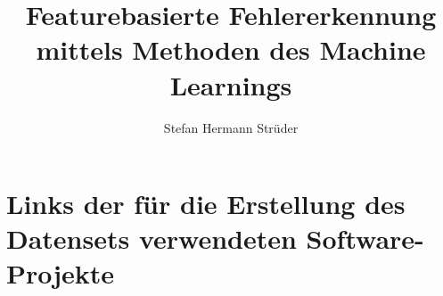 \documentclass[master,twoside,extern,palatino]{rgseThesis}
\author{Stefan Hermann Strüder}
\title{Featurebasierte Fehlererkennung mittels Methoden des Machine Learnings}
\begin{document}

    \maketitle

    
    
    

    \tableofcontents
    \cleardoublepage

    \listoffigures   %


    

    

    
    
    
    
    
    
    
    
    


    \printbibliography[heading=bibintoc]

\appendix

\chapter{Links der für die Erstellung des Datensets verwendeten Software-Projekte}
\label{appendix1}
\end{document}
